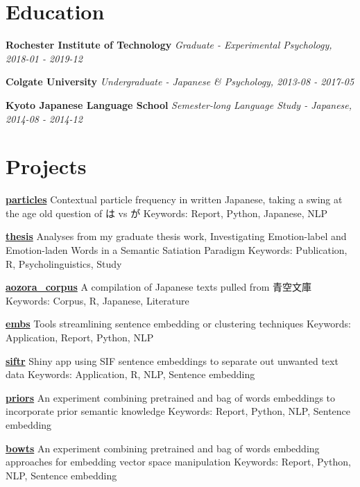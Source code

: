 \documentclass[a4paper,9pt]{extarticle}
\begin{document}
\section*{Education}

\noindent
\textbf{Rochester Institute of Technology}
\textit{Graduate - Experimental Psychology, 2018-01 - 2019-12}

\noindent
\textbf{Colgate University}
\textit{Undergraduate - Japanese \& Psychology, 2013-08 - 2017-05}

\noindent
\textbf{Kyoto Japanese Language School}
\textit{Semester-long Language Study - Japanese, 2014-08 - 2014-12}




\section*{Projects}

\noindent
\textbf{\href{https://github.com/ryancahildebrandt/particles}{particles}}
Contextual particle frequency in written Japanese, taking a swing at the age old question of は vs が
Keywords: Report, Python, Japanese, NLP

\noindent
\textbf{\href{https://github.com/ryancahildebrandt/thesis}{thesis}}
Analyses from my graduate thesis work, Investigating Emotion-label and Emotion-laden Words in a Semantic Satiation Paradigm
Keywords: Publication, R, Psycholinguistics, Study

\noindent
\textbf{\href{https://github.com/ryancahildebrandt/aozora\_corpus}{aozora\_corpus}}
A compilation of Japanese texts pulled from 青空文庫
Keywords: Corpus, R, Japanese, Literature

\noindent
\textbf{\href{https://github.com/ryancahildebrandt/embs}{embs}}
Tools streamlining sentence embedding or clustering techniques
Keywords: Application, Report, Python, NLP

\noindent
\textbf{\href{https://github.com/ryancahildebrandt/siftr}{siftr}}
Shiny app using SIF sentence embeddings to separate out unwanted text data
Keywords: Application, R, NLP, Sentence embedding

\noindent
\textbf{\href{https://github.com/ryancahildebrandt/priors}{priors}}
An experiment combining pretrained and bag of words embeddings to incorporate prior semantic knowledge
Keywords: Report, Python, NLP, Sentence embedding

\noindent
\textbf{\href{https://github.com/ryancahildebrandt/bowts}{bowts}}
An experiment combining pretrained and bag of words embedding approaches for embedding vector space manipulation
Keywords: Report, Python, NLP, Sentence embedding
\end{document}
